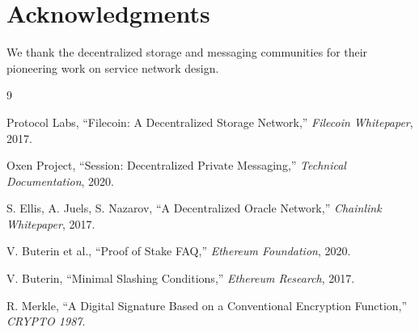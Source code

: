 \documentclass[11pt,a4paper]{article}
\begin{document}
\section*{Acknowledgments}

We thank the decentralized storage and messaging communities for their pioneering work on service network design.


\begin{thebibliography}{9}

Protocol Labs, ``Filecoin: A Decentralized Storage Network,'' \textit{Filecoin Whitepaper}, 2017.

Oxen Project, ``Session: Decentralized Private Messaging,'' \textit{Technical Documentation}, 2020.

S. Ellis, A. Juels, S. Nazarov, ``A Decentralized Oracle Network,'' \textit{Chainlink Whitepaper}, 2017.

V. Buterin et al., ``Proof of Stake FAQ,'' \textit{Ethereum Foundation}, 2020.

V. Buterin, ``Minimal Slashing Conditions,'' \textit{Ethereum Research}, 2017.

R. Merkle, ``A Digital Signature Based on a Conventional Encryption Function,'' \textit{CRYPTO 1987}.

\end{thebibliography}
\end{document}
